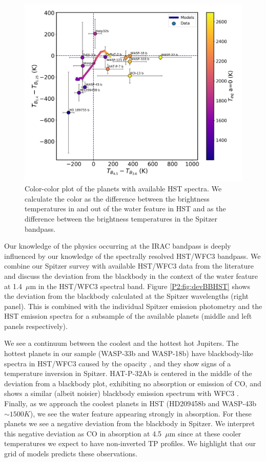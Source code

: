 \begin{figure}
    \centering
    \includegraphics[trim={0.5cm 0.5cm 0.5cm 0.5cm},clip,width=\linewidth]{Tb14-Tb125vsTb45-Tb36.pdf}
    \caption{Color-color plot of the planets with available HST spectra. We calculate the color as the difference between the brightness temperatures in and out of the water feature in HST and as the difference between the brightness temperatures in the Spitzer bandpass.}
    \label{P2:fig:TbHST}
\end{figure}

Our knowledge of the physics occurring at the IRAC bandpass is deeply influenced by our knowledge of the spectrally resolved HST/WFC3 bandpass. We combine our Spitzer survey with available HST/WFC3 data from the literature and discuss the deviation from the blackbody in the context of the water feature at 1.4~$\mu$m in the HST/WFC3 spectral band. Figure \ref{P2:fig:devBBHST} shows the deviation from the blackbody calculated at the Spitzer wavelengths (right panel). This is combined with the individual Spitzer emission photometry and the HST emission spectra for a subsample of the available planets (middle and left panels respectively).

We see a continuum between the coolest and the hottest hot Jupiters. The hottest planets in our sample (WASP-33b and WASP-18b) have blackbody-like  spectra in HST/WFC3 caused by the  opacity \citep{Arcangeli2018}, and they show signs of a temperature inversion in Spitzer. HAT-P-32Ab is centered in the middle of the deviation from a blackbody plot, exhibiting no absorption or emission of CO, and shows a similar (albeit  noisier) blackbody emission spectrum with WFC3 \citep{Nikolov2018}. Finally, as we approach the coolest planets in HST (HD209458b and WASP-43b $\sim1500K$), we see the water feature appearing strongly in absorption. For these planets we see a negative deviation from the blackbody in Spitzer. We interpret this negative deviation as CO in absorption at 4.5~$\mu$m since at these cooler temperatures we expect to have non-inverted TP profiles. We highlight that our grid of models predicts these observations.

